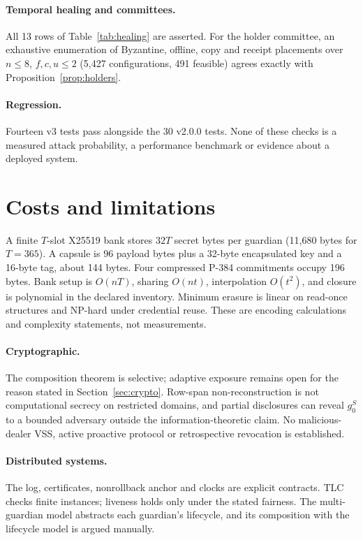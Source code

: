 \documentclass[pdflatex,sn-mathphys-num]{sn-jnl}
\theoremstyle{plain}
\theoremstyle{definition}
\begin{document}
\paragraph{Temporal healing and committees.}
All 13 rows of Table~\ref{tab:healing} are asserted. For the holder committee, an exhaustive enumeration of Byzantine, offline, copy and receipt placements over $n\le8$, $f,c,u\le2$ (5,427 configurations, 491 feasible) agrees exactly with Proposition~\ref{prop:holders}.

\paragraph{Regression.}
Fourteen v3 tests pass alongside the 30 v2.0.0 tests. None of these checks is a measured attack probability, a performance benchmark or evidence about a deployed system.


\section{Costs and limitations}\label{sec:limits}

A finite $T$-slot X25519 bank stores $32T$ secret bytes per guardian (11,680 bytes for $T=365$). A capsule is 96 payload bytes plus a 32-byte encapsulated key and a 16-byte tag, about 144 bytes. Four compressed P-384 commitments occupy 196 bytes. Bank setup is $O(nT)$, sharing $O(nt)$, interpolation $O(t^2)$, and closure is polynomial in the declared inventory. Minimum erasure is linear on read-once structures and NP-hard under credential reuse. These are encoding calculations and complexity statements, not measurements.

\paragraph{Cryptographic.}
The composition theorem is selective; adaptive exposure remains open for the reason stated in Section~\ref{sec:crypto}. Row-span non-reconstruction is not computational secrecy on restricted domains, and partial disclosures can reveal $g_0^{S}$ to a bounded adversary outside the information-theoretic claim. No malicious-dealer VSS, active proactive protocol or retrospective revocation is established.

\paragraph{Distributed systems.}
The log, certificates, nonrollback anchor and clocks are explicit contracts. TLC checks finite instances; liveness holds only under the stated fairness. The multi-guardian model abstracts each guardian's lifecycle, and its composition with the lifecycle model is argued manually.
\end{document}
